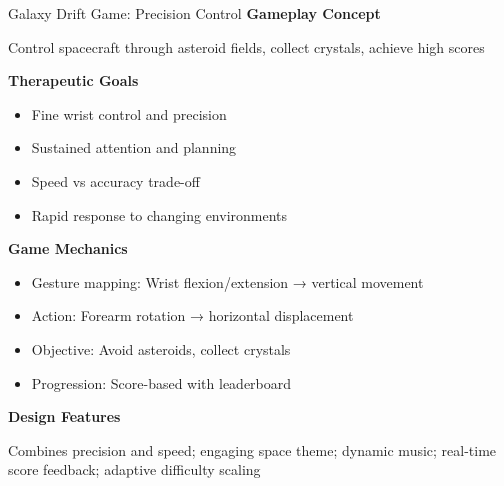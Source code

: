 \begin{frame}{Galaxy Drift Game: Precision Control}
	\textbf{\textcolor{gbAqua}{Gameplay Concept}}
	
	Control spacecraft through asteroid fields, collect crystals, achieve high scores
	
	\vspace{0.2cm}
	
	\textbf{\textcolor{gbAqua}{Therapeutic Goals}}
	
	\begin{itemize}
		\item Fine wrist control and precision
		\item Sustained attention and planning
		\item Speed vs accuracy trade-off
		\item Rapid response to changing environments
	\end{itemize}
	
	\vspace{0.2cm}
	
	\textbf{\textcolor{gbAqua}{Game Mechanics}}
	
	\begin{itemize}
		\item Gesture mapping: Wrist flexion/extension → vertical movement
		\item Action: Forearm rotation → horizontal displacement
		\item Objective: Avoid asteroids, collect crystals
		\item Progression: Score-based with leaderboard
	\end{itemize}
	
	\vspace{0.2cm}
	
	\textbf{\textcolor{gbAqua}{Design Features}}
	
	Combines precision and speed; engaging space theme; dynamic music; real-time score feedback; adaptive difficulty scaling
\end{frame}

